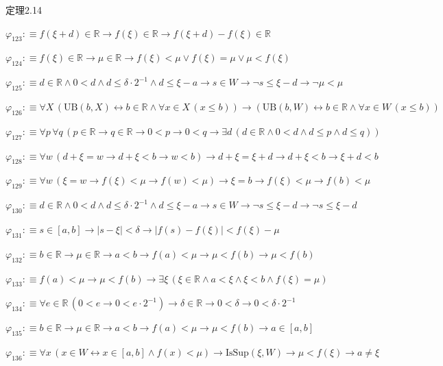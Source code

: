 \begin{fullproof}{定理2.14}
\begin{abbrevlist}
\item $\varphi_{123} :\equiv f(\xi + d) \in \mathbb{R} \to f(\xi) \in \mathbb{R} \to f(\xi + d) - f(\xi) \in \mathbb{R}$
\item $\varphi_{124} :\equiv f(\xi) \in \mathbb{R} \to \mu \in \mathbb{R} \to f(\xi) < \mu \lor f(\xi) = \mu \lor \mu < f(\xi)$
\item $\varphi_{125} :\equiv d \in \mathbb{R} \land 0 < d \land d \leq \delta \cdot 2^{-1} \land d \leq \xi - a \to s \in W \to \neg s \leq \xi - d \to \neg \mu < \mu$
\item $\varphi_{126} :\equiv \forall X\,(\mathrm{UB}(b,X) \leftrightarrow b \in \mathbb{R} \land \forall x \in X\,(x \leq b)) \to (\mathrm{UB}(b,W) \leftrightarrow b \in \mathbb{R} \land \forall x \in W\,(x \leq b))$
\item $\varphi_{127} :\equiv \forall p\,\forall q\,(p \in \mathbb{R} \to q \in \mathbb{R} \to 0 < p \to 0 < q \to \exists d\,(d \in \mathbb{R} \land 0 < d \land d \leq p \land d \leq q))$
\item $\varphi_{128} :\equiv \forall w\,(d + \xi = w \to d + \xi < b \to w < b) \to d + \xi = \xi + d \to d + \xi < b \to \xi + d < b$
\item $\varphi_{129} :\equiv \forall w\,(\xi = w \to f(\xi) < \mu \to f(w) < \mu) \to \xi = b \to f(\xi) < \mu \to f(b) < \mu$
\item $\varphi_{130} :\equiv d \in \mathbb{R} \land 0 < d \land d \leq \delta \cdot 2^{-1} \land d \leq \xi - a \to s \in W \to \neg s \leq \xi - d \to \neg s \leq \xi - d$
\item $\varphi_{131} :\equiv s \in [a,b] \to \lvert s - \xi \rvert < \delta \to \lvert f(s) - f(\xi) \rvert < f(\xi) - \mu$
\item $\varphi_{132} :\equiv b \in \mathbb{R} \to \mu \in \mathbb{R} \to a < b \to f(a) < \mu \to \mu < f(b) \to \mu < f(b)$
\item $\varphi_{133} :\equiv f(a) < \mu \to \mu < f(b) \to \exists \xi\,(\xi \in \mathbb{R} \land a < \xi \land \xi < b \land f(\xi) = \mu)$
\item $\varphi_{134} :\equiv \forall e \in \mathbb{R}\,(0 < e \to 0 < e \cdot 2^{-1}) \to \delta \in \mathbb{R} \to 0 < \delta \to 0 < \delta \cdot 2^{-1}$
\item $\varphi_{135} :\equiv b \in \mathbb{R} \to \mu \in \mathbb{R} \to a < b \to f(a) < \mu \to \mu < f(b) \to a \in [a,b]$
\item $\varphi_{136} :\equiv \forall x\,(x \in W \leftrightarrow x \in [a,b] \land f(x) < \mu) \to \mathrm{IsSup}(\xi,W) \to \mu < f(\xi) \to a \neq \xi$

\end{abbrevlist}
\end{fullproof}
